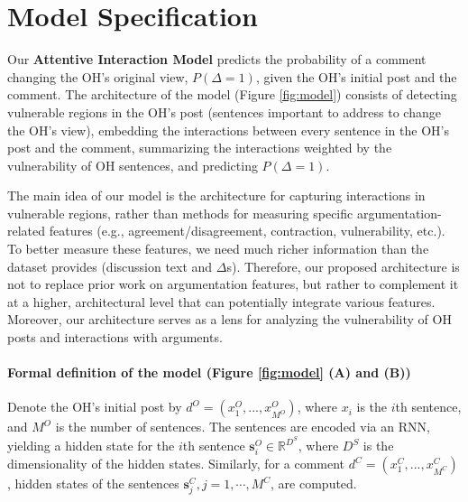 \documentclass[11pt,a4paper]{article}
\begin{document}
\section{Model Specification\label{sec:model}}

Our \textbf{Attentive Interaction Model} predicts the probability of a comment changing the OH's original view, $P(\Delta = 1)$, given the OH's initial post and the comment. The architecture of the model (Figure \ref{fig:model}) consists of detecting vulnerable regions in the OH's post (sentences important to address to change the OH's view), embedding the interactions between every sentence in the OH's post and the comment, summarizing the interactions weighted by the vulnerability of OH sentences, and predicting $P(\Delta=1)$.

The main idea of our model is the architecture for capturing interactions in vulnerable regions, rather than methods for measuring specific argumentation-related features (e.g., agreement/disagreement, contraction, vulnerability, etc.). To better measure these features, we need much richer information than the dataset provides (discussion text and $\Delta$s). Therefore, our proposed architecture is not to replace prior work on argumentation features, but rather to complement it at a higher, architectural level that can potentially integrate various features. Moreover, our architecture serves as a lens for analyzing the vulnerability of OH posts and interactions with arguments. 

\newcommand{\dop}{d^{O}}
\newcommand{\xop}{x^{O}}
\newcommand{\vs}{\mathbf{s}}
\newcommand{\sop}{\vs^{O}}
\newcommand{\dco}{d^{C}}
\newcommand{\xco}{x^{C}}
\newcommand{\sco}{\vs^{C}}
\newcommand{\vv}{\mathbf{v}}
\newcommand{\vh}{\mathbf{h}}
\newcommand{\umax}{\mathbf{u}^{\rm{max}}}
\newcommand{\umean}{\mathbf{u}^{\rm{mean}}}
\newcommand{\Dse}{D^{S}}
\newcommand{\Din}{D^{I}}

\paragraph{Formal definition of the model (Figure \ref{fig:model} (A) and (B))} Denote the OH's initial post by $\dop = (\xop_1, ..., \xop_{M^{O}})$, where $x_i$ is the $i$th sentence, and $M^{O}$ is the number of sentences. The sentences are encoded via an RNN, yielding a hidden state for the $i$th sentence $\sop_i \in \mathbb{R}^{\Dse}$, where $\Dse$ is the dimensionality of the hidden states. Similarly, for a comment $\dco = (\xco_1, ..., \xco_{M^{C}})$, hidden states of the sentences $\sco_j, j = 1, \cdots, M^C$, are computed.
\end{document}
